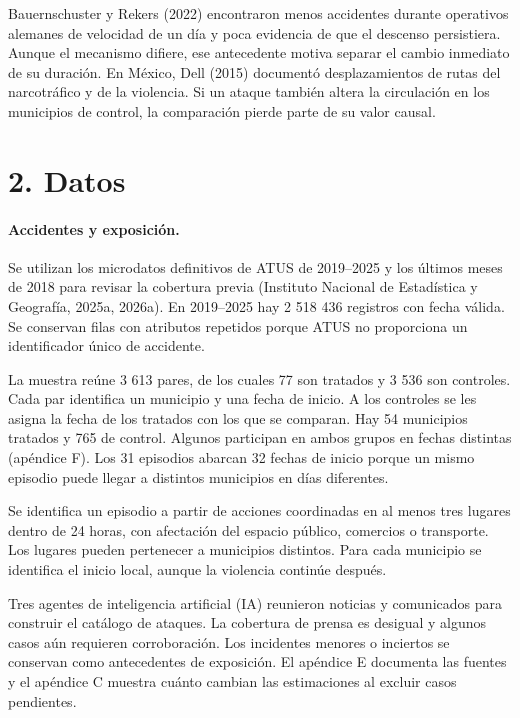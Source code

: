 \documentclass[11pt,letterpaper]{article}
\begin{document}
Bauernschuster y Rekers (2022) encontraron menos accidentes durante operativos alemanes de velocidad de un día y poca evidencia de que el descenso persistiera. Aunque el mecanismo difiere, ese antecedente motiva separar el cambio inmediato de su duración. En México, Dell (2015) documentó desplazamientos de rutas del narcotráfico y de la violencia. Si un ataque también altera la circulación en los municipios de control, la comparación pierde parte de su valor causal.\par


\section*{2. Datos}

\paragraph{Accidentes y exposición.}

Se utilizan los microdatos definitivos de ATUS de 2019--2025 y los últimos meses de 2018 para revisar la cobertura previa (Instituto Nacional de Estadística y Geografía, 2025a, 2026a). En 2019--2025 hay 2 518 436 registros con fecha válida. Se conservan filas con atributos repetidos porque ATUS no proporciona un identificador único de accidente.\par

La muestra reúne 3 613 pares, de los cuales 77 son tratados y 3 536 son controles. Cada par identifica un municipio y una fecha de inicio. A los controles se les asigna la fecha de los tratados con los que se comparan. Hay 54 municipios tratados y 765 de control. Algunos participan en ambos grupos en fechas distintas (apéndice F). Los 31 episodios abarcan 32 fechas de inicio porque un mismo episodio puede llegar a distintos municipios en días diferentes.\par

Se identifica un episodio a partir de acciones coordinadas en al menos tres lugares dentro de 24 horas, con afectación del espacio público, comercios o transporte. Los lugares pueden pertenecer a municipios distintos. Para cada municipio se identifica el inicio local, aunque la violencia continúe después.\par

Tres agentes de inteligencia artificial (IA) reunieron noticias y comunicados para construir el catálogo de ataques. La cobertura de prensa es desigual y algunos casos aún requieren corroboración. Los incidentes menores o inciertos se conservan como antecedentes de exposición. El apéndice E documenta las fuentes y el apéndice C muestra cuánto cambian las estimaciones al excluir casos pendientes.\par
\end{document}
